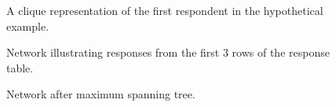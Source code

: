 \begin{figure}[]
    \noindent
    \caption{A clique representation of the first respondent in the hypothetical example.  \label{clique}}
\end{figure}

\begin{figure}[]
    \noindent
    \caption{Network illustrating responses from the first 3 rows of the response table. \label{graph}}
\end{figure}

\begin{figure}[]
    \noindent
    \caption{Network after maximum spanning tree.\label{tree}}
\end{figure}

